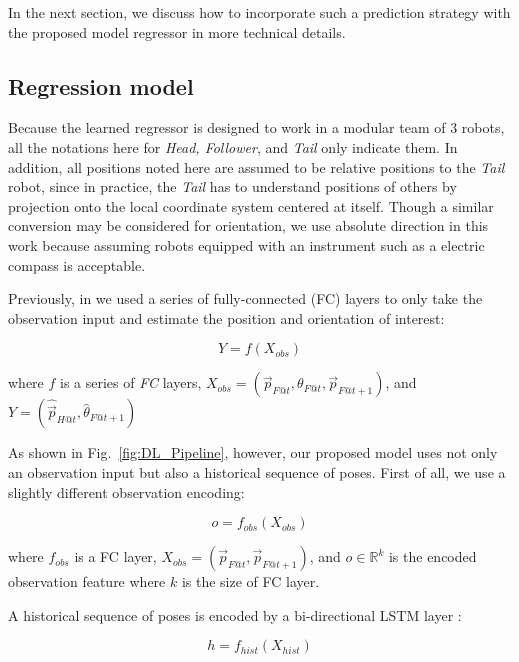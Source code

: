 \documentclass[letterpaper, 10 pt, conference]{ieeeconf}  %
\begin{document}
	In the next section, we discuss how to incorporate such a prediction strategy with
	the proposed model regressor in more technical details.


	\subsection{Regression model}
	\label{sec:regression_model}

	Because the learned regressor is designed to work in a modular team of $3$ robots,
	all the notations here for \emph{Head, Follower}, and \emph{Tail} only indicate
	them. In addition, all positions noted here are assumed to be relative positions
	to the \emph{Tail} robot, since in practice, the \emph{Tail} has to understand
	positions of others by projection onto the local coordinate system centered
	at itself. Though a similar conversion may be considered for orientation,
	we use absolute direction in this work because assuming robots equipped
	with an instrument such as a electric compass is acceptable.

	Previously, in \cite{CPR17} we used a series of fully-connected (FC) layers
	to only take the observation input and estimate the position and orientation
	of interest:

	\begin{equation}
	Y = f(X_{obs})
	\end{equation}

	\begin{flushleft}
	where $f$ is a series of \emph{FC} layers,
	$X_{obs} = (\vec{p}_{F@t}, \theta_{F@t}, \vec{p}_{F@t+1})$, and
	$Y = (\hat{\vec{p}}_{H@t}, \hat{\theta}_{F@t+1})$
	\end{flushleft}

	As shown in Fig.~\ref{fig:DL_Pipeline}, however, our proposed model uses not only
	an observation input but also a historical sequence of poses. First of all, we
	use a slightly different observation encoding:

	\begin{equation}
	o = f_{obs}(X_{obs})
	\end{equation}

	where $f_{obs}$ is a FC layer,
		$X_{obs} = (\vec{p}_{F@t}, \vec{p}_{F@t+1})$,
		and $o \in \mathbb{R}^{k}$ is the encoded observation feature
		where $k$ is the size of FC layer.

	A historical sequence of poses is encoded by a bi-directional LSTM layer \cite{Wu16}:

	\begin{equation}
	h = f_{hist}(X_{hist})
	\end{equation}
\end{document}
